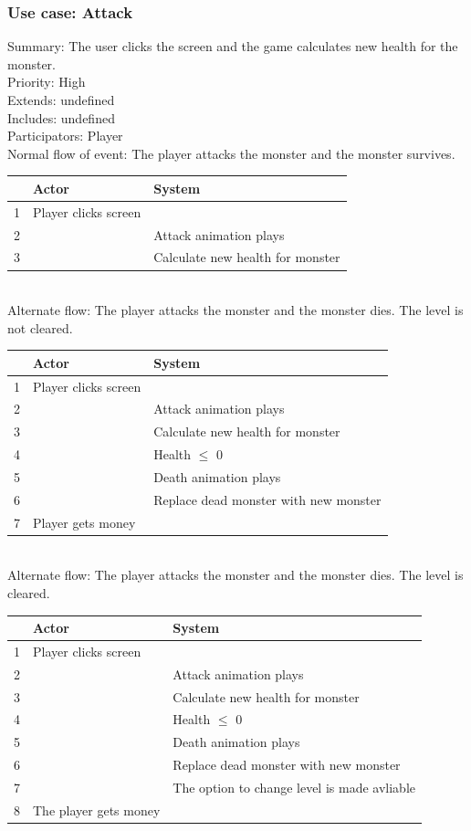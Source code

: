 \documentclass{article}
\begin{document}
\subsubsection{Use case: Attack}
Summary: The user clicks the screen and the game calculates new health for the monster.\\
Priority: High\\
Extends: undefined\\
Includes: undefined\\
Participators: Player\\
Normal flow of event: The player attacks the monster and the monster survives.
\begin{tabular}{| c | l | l |} \hline
    & Actor & System \\ \hline
    1 & Player clicks screen & \\ \hline
    2 & & Attack animation plays \\ \hline
    3 & & Calculate new health for monster\\ \hline
\end{tabular}\\
Alternate flow: The player attacks the monster and the monster dies. The level is not cleared.\\
\begin{tabular}{| c | l | l |} \hline
    & Actor & System \\ \hline
    1 & Player clicks screen & \\ \hline
    2 & & Attack animation plays \\ \hline
    3 & & Calculate new health for monster\\ \hline
    4 & & Health $\le$ 0 \\ \hline
    5 & & Death animation plays \\ \hline 
    6 & & Replace dead monster with new monster \\ \hline
    7 & Player gets money & \\ \hline
\end{tabular}\\
Alternate flow: The player attacks the monster and the monster dies. The level is cleared.\\
\begin{tabular}{| c | l | l |} \hline
    & Actor & System \\ \hline
    1 & Player clicks screen & \\ \hline
    2 & & Attack animation plays \\ \hline
    3 & & Calculate new health for monster\\ \hline
    4 & & Health $\le$ 0 \\ \hline
    5 & & Death animation plays \\ \hline 
    6 & & Replace dead monster with new monster \\ \hline
    7 & & The option to change level is made avliable\\ \hline
    8 & The player gets money & \\ \hline
\end{tabular}
\end{document}
